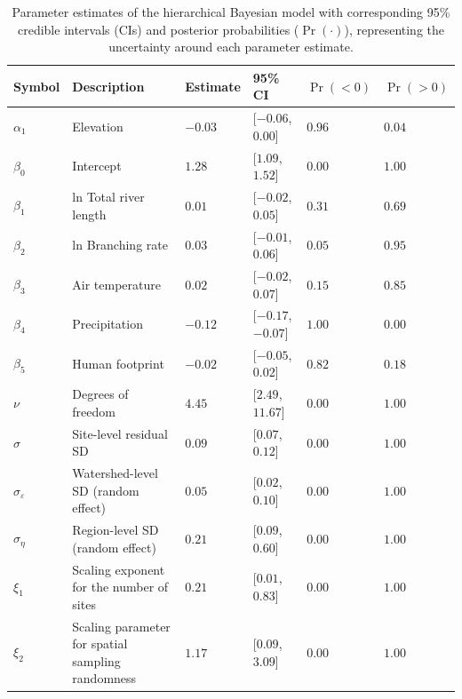 \begin{table}[ht]
\centering
\caption{Parameter estimates of the hierarchical Bayesian model 
             with corresponding 95\% credible intervals (CIs) and 
             posterior probabilities ($\Pr(\cdot)$), 
             representing the uncertainty around each parameter estimate.} 
\label{tab:parms-est}
\begingroup\small
\begin{tabularx}{\textwidth}{llllll}
  \hline
Symbol & Description & Estimate & 95\% CI & $\Pr(< 0)$ & $\Pr(> 0)$ \\ 
  \hline
$\alpha_1$ & Elevation & $-0.03$ & [$-0.06$, $0.00$] & $0.96$ & $0.04$ \\ 
  $\beta_0$ & Intercept & $1.28$ & [$1.09$, $1.52$] & $0.00$ & $1.00$ \\ 
  $\beta_1$ & ln Total river length & $0.01$ & [$-0.02$, $0.05$] & $0.31$ & $0.69$ \\ 
  $\beta_2$ & ln Branching rate & $0.03$ & [$-0.01$, $0.06$] & $0.05$ & $0.95$ \\ 
  $\beta_3$ & Air temperature & $0.02$ & [$-0.02$, $0.07$] & $0.15$ & $0.85$ \\ 
  $\beta_4$ & Precipitation & $-0.12$ & [$-0.17$, $-0.07$] & $1.00$ & $0.00$ \\ 
  $\beta_5$ & Human footprint & $-0.02$ & [$-0.05$, $0.02$] & $0.82$ & $0.18$ \\ 
  $\nu$ & Degrees of freedom & $4.45$ & [$2.49$, $11.67$] & $0.00$ & $1.00$ \\ 
  $\sigma$ & Site-level residual SD & $0.09$ & [$0.07$, $0.12$] & $0.00$ & $1.00$ \\ 
  $\sigma_{\varepsilon}$ & Watershed-level SD (random effect) & $0.05$ & [$0.02$, $0.10$] & $0.00$ & $1.00$ \\ 
  $\sigma_{\eta}$ & Region-level SD (random effect) & $0.21$ & [$0.09$, $0.60$] & $0.00$ & $1.00$ \\ 
  $\xi_{1}$ & Scaling exponent for the number of sites & $0.21$ & [$0.01$, $0.83$] & $0.00$ & $1.00$ \\ 
  $\xi_{2}$ & Scaling parameter for spatial sampling randomness & $1.17$ & [$0.09$, $3.09$] & $0.00$ & $1.00$ \\ 
   \hline
\end{tabularx}
\endgroup
\end{table}
